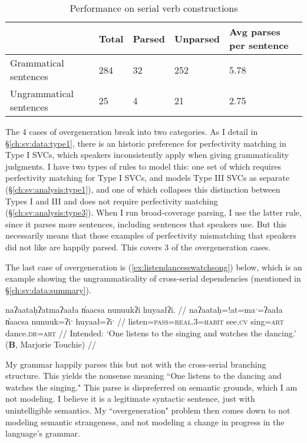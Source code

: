 \begin{table}[H]
\centering
\caption{Performance on serial verb constructions}
\label{table:svc-coverage}
\begin{tabular}{l|llll}
 & Total & Parsed & Unparsed & Avg parses per sentence \\ \hline
Grammatical sentences & 284 & 32 & 252 & 5.78 \\ \hline
Ungrammatical sentences & 25 & 4 & 21 & 2.75
\end{tabular}
\end{table}

The 4 cases of overgeneration break into two categories. As I detail in \S\ref{ch:sv:data:type1}, there is an historic preference for perfectivity matching in Type I SVCs, which speakers inconsistently apply when giving grammaticality judgments. I have two types of rules to model this: one set of which requires perfectivity matching for Type I SVCs, and models Type III SVCs as separate (\S\ref{ch:sv:analysis:type1}), and one of which collapses this distinction between Types I and III and does not require perfectivity matching (\S\ref{ch:sv:analysis:type3}). When I run broad-coverage parsing, I use the latter rule, since it parses more sentences, including sentences that speakers use. But this necessarily means that those examples of perfectivity mismatching that speakers did not like are happily parsed. This covers 3 of the overgeneration cases.

The last case of overgeneration is (\ref{ex:listendancesswatchsong}) below, which is an example showing the ungrammaticality of cross-serial dependencies (mentioned in \S\ref{ch:sv:data:summary}).

\ex \label{ex:listendancesswatchsong}
\begingl
\glpreamble *naʔaataḥʔatmaʔaała n̓aacsa nunuukʔi huyaałʔi. //
\gla naʔaataḥ=!at=maˑ=ʔaała n̓aacsa nunuuk=ʔiˑ huyaał=ʔiˑ //
\glb listen=\textsc{pass}=\textsc{real.3}=\textsc{habit} see.\textsc{cv} sing=\textsc{art} dance.\textsc{dr}=\textsc{art} //
\glft Intended: `One listens to the singing and watches the dancing.' (\textbf{B}, Marjorie Touchie) //
\endgl
\xe

My grammar happily parses this but not with the cross-serial branching structure. This yields the nonsense meaning ``One listens to the dancing and watches the singing." This parse is dispreferred on semantic grounds, which I am not modeling. I believe it is a legitimate syntactic sentence, just with unintelligible semantics. My ``overgeneration" problem then comes down to not modeling semantic strangeness, and not modeling a change in progress in the language's grammar.

